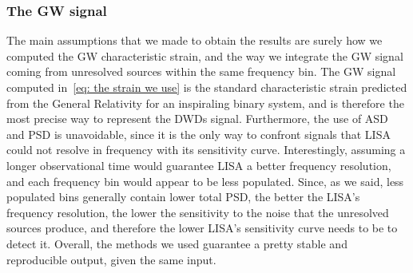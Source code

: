 \subsubsection{The GW signal}
The main assumptions that we made to obtain the results are surely how we computed the GW characteristic strain, and the way we integrate the GW signal coming from unresolved sources within the same frequency bin.
The GW signal computed in~\eqref{eq: the strain we use} is the standard characteristic strain predicted from the General Relativity for an inspiraling binary system, and is therefore the most precise way to represent the DWDs signal.
Furthermore, the use of ASD and PSD is unavoidable, since it is the only way to confront signals that LISA could not resolve in frequency with its sensitivity curve.
Interestingly, assuming a longer observational time would guarantee LISA a better frequency resolution, and each frequency bin would appear to be less populated.
Since, as we said, less populated bins generally contain lower total PSD, the better the LISA's frequency resolution, the lower the sensitivity to the noise that the unresolved sources produce, and therefore the lower LISA's sensitivity curve needs to be to detect it.
Overall, the methods we used guarantee a pretty stable and reproducible output, given the same input.


